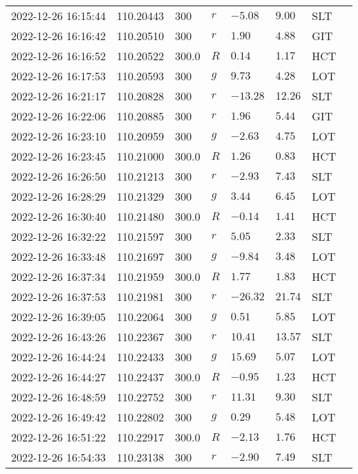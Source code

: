 \documentclass{nature_plusfigure}
\begin{document}
\begin{supplement}
\begin{center}
\begin{longtable}{llllllll}
2022-12-26 16:15:44 & 110.20443 & 300 & $r$ & $-5.08$ & $9.00$ & SLT &  \\ 
2022-12-26 16:16:42 & 110.20510 & 300 & $r$ & $1.90$ & $4.88$ & GIT &  \\ 
2022-12-26 16:16:52 & 110.20522 & 300.0 & $R$ & $0.14$ & $1.17$ & HCT &  \\ 
2022-12-26 16:17:53 & 110.20593 & 300 & $g$ & $9.73$ & $4.28$ & LOT &  \\ 
2022-12-26 16:21:17 & 110.20828 & 300 & $r$ & $-13.28$ & $12.26$ & SLT &  \\ 
2022-12-26 16:22:06 & 110.20885 & 300 & $r$ & $1.96$ & $5.44$ & GIT &  \\ 
2022-12-26 16:23:10 & 110.20959 & 300 & $g$ & $-2.63$ & $4.75$ & LOT &  \\ 
2022-12-26 16:23:45 & 110.21000 & 300.0 & $R$ & $1.26$ & $0.83$ & HCT &  \\ 
2022-12-26 16:26:50 & 110.21213 & 300 & $r$ & $-2.93$ & $7.43$ & SLT &  \\ 
2022-12-26 16:28:29 & 110.21329 & 300 & $g$ & $3.44$ & $6.45$ & LOT &  \\ 
2022-12-26 16:30:40 & 110.21480 & 300.0 & $R$ & $-0.14$ & $1.41$ & HCT &  \\ 
2022-12-26 16:32:22 & 110.21597 & 300 & $r$ & $5.05$ & $2.33$ & SLT &  \\ 
2022-12-26 16:33:48 & 110.21697 & 300 & $g$ & $-9.84$ & $3.48$ & LOT &  \\ 
2022-12-26 16:37:34 & 110.21959 & 300.0 & $R$ & $1.77$ & $1.83$ & HCT &  \\ 
2022-12-26 16:37:53 & 110.21981 & 300 & $r$ & $-26.32$ & $21.74$ & SLT &  \\ 
2022-12-26 16:39:05 & 110.22064 & 300 & $g$ & $0.51$ & $5.85$ & LOT &  \\ 
2022-12-26 16:43:26 & 110.22367 & 300 & $r$ & $10.41$ & $13.57$ & SLT &  \\ 
2022-12-26 16:44:24 & 110.22433 & 300 & $g$ & $15.69$ & $5.07$ & LOT &  \\ 
2022-12-26 16:44:27 & 110.22437 & 300.0 & $R$ & $-0.95$ & $1.23$ & HCT &  \\ 
2022-12-26 16:48:59 & 110.22752 & 300 & $r$ & $11.31$ & $9.30$ & SLT &  \\ 
2022-12-26 16:49:42 & 110.22802 & 300 & $g$ & $0.29$ & $5.48$ & LOT &  \\ 
2022-12-26 16:51:22 & 110.22917 & 300.0 & $R$ & $-2.13$ & $1.76$ & HCT &  \\ 
2022-12-26 16:54:33 & 110.23138 & 300 & $r$ & $-2.90$ & $7.49$ & SLT &  \\ 

\end{longtable}
\end{center}
\end{supplement}
\end{document}
